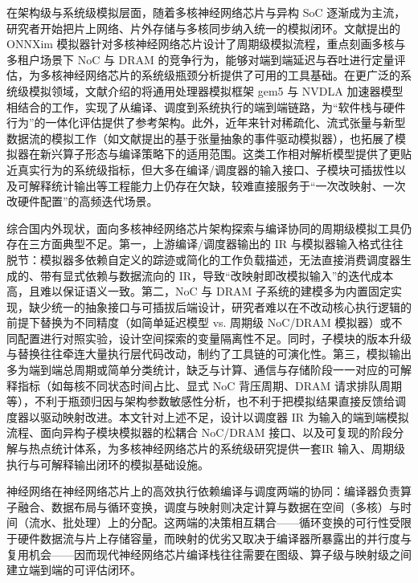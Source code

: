 在架构级与系统级模拟层面，随着多核神经网络芯片与异构 SoC 逐渐成为主流，研究者开始把片上网络、片外存储与多核同步纳入统一的模拟闭环。文献\parencite{jin2024onnxim}提出的 ONNXim 模拟器针对多核神经网络芯片设计了周期级模拟流程，重点刻画多核与多租户场景下 NoC 与 DRAM 的竞争行为，能够对端到端延迟与吞吐进行定量评估，为多核神经网络芯片的系统级瓶颈分析提供了可用的工具基础。在更广泛的系统级模拟领域，文献\parencite{zhang2023gem5nvdla}介绍的将通用处理器模拟框架 gem5 与 NVDLA 加速器模型相结合的工作，实现了从编译、调度到系统执行的端到端链路，为“软件栈与硬件行为”的一体化评估提供了参考架构。此外，近年来针对稀疏化、流式张量与新型数据流的模拟工作（如文献\parencite{set2023isca}提出的基于张量抽象的事件驱动模拟器），也拓展了模拟器在新兴算子形态与编译策略下的适用范围。这类工作相对解析模型提供了更贴近真实行为的系统级指标，但大多在编译/调度器的输入接口、子模块可插拔性以及可解释统计输出等工程能力上仍存在欠缺，较难直接服务于“一次改映射、一次改硬件配置”的高频迭代场景。

综合国内外现状，面向多核神经网络芯片架构探索与编译协同的周期级模拟工具仍存在三方面典型不足。第一，上游编译/调度器输出的 IR 与模拟器输入格式往往脱节：模拟器多依赖自定义的踪迹或简化的工作负载描述，无法直接消费调度器生成的、带有显式依赖与数据流向的 IR，导致“改映射即改模拟输入”的迭代成本高，且难以保证语义一致。第二，NoC 与 DRAM 子系统的建模多为内置固定实现，缺少统一的抽象接口与可插拔后端设计，研究者难以在不改动核心执行逻辑的前提下替换为不同精度（如简单延迟模型 vs. 周期级 NoC/DRAM 模拟器）或不同配置进行对照实验，设计空间探索的变量隔离性不足。同时，子模块的版本升级与替换往往牵连大量执行层代码改动，制约了工具链的可演化性。第三，模拟输出多为端到端总周期或简单分类统计，缺乏与计算、通信与存储阶段一一对应的可解释指标（如每核不同状态时间占比、显式 NoC 背压周期、DRAM 请求排队周期等），不利于瓶颈归因与架构参数敏感性分析，也不利于把模拟结果直接反馈给调度器以驱动映射改进。本文针对上述不足，设计以调度器 IR 为输入的端到端模拟流程、面向异构子模块模拟器的松耦合 NoC/DRAM 接口、以及可复现的阶段分解与热点统计体系，为多核神经网络芯片的系统级研究提供一套IR 输入、周期级执行与可解释输出闭环的模拟基础设施。


神经网络在神经网络芯片上的高效执行依赖编译与调度两端的协同：编译器负责算子融合、数据布局与循环变换，调度与映射则决定计算与数据在空间（多核）与时间（流水、批处理）上的分配。这两端的决策相互耦合——循环变换的可行性受限于硬件数据流与片上存储容量，而映射的优劣又取决于编译器所暴露出的并行度与复用机会——因而现代神经网络芯片编译栈往往需要在图级、算子级与映射级之间建立端到端的可评估闭环。

